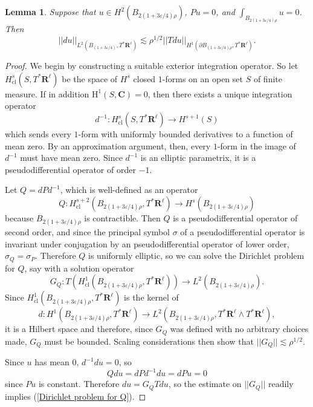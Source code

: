 \documentclass[reqno,12pt,letterpaper]{amsart}
\newcommand{\RR}{\mathbf{R}}
\newcommand{\CC}{\mathbf{C}}
\newcommand{\Homology}{\mathrm H}
\newtheorem{lemma}[theorem]{Lemma}
\theoremstyle{definition}
\numberwithin{equation}{section}
\begin{document}
\begin{lemma}\label{Poincare lemma}
Suppose that $u \in H^2(B_{2(1 + 3\varepsilon/4)\rho})$, $Pu = 0$, and $\int_{B_{2(1 + 3\varepsilon/4)\rho}} u = 0$.
Then
\begin{equation}\label{Dirichlet problem for Q}
||du||_{L^2(B_{(1 + 3\varepsilon/4)}, T^* \RR^\ell)} \lesssim \rho^{1/2} ||Tdu||_{H^1(\partial B_{(1 + 3\varepsilon/4)\rho}, T^* \RR^\ell)}.
\end{equation}
\end{lemma}
\begin{proof}
We begin by constructing a suitable exterior integration operator.
So let $H^s_{\mathrm{cl}}(S, T^* \RR^\ell)$ be the space of $H^s$ closed $1$-forms on an open set $S$ of finite measure.
If in addition $\Homology^1(S, \CC) = 0$, then there exists a unique integration operator
$$d^{-1}: H^s_{\mathrm{cl}}(S, T^* \RR^\ell) \to H^{s + 1}(S)$$
which sends every $1$-form with uniformly bounded derivatives to a function of mean zero.
By an approximation argument, then, every $1$-form in the image of $d^{-1}$ must have mean zero.
Since $d^{-1}$ is an elliptic parametrix, it is a pseudodifferential operator of order $-1$.

Let $Q = dPd^{-1}$, which is well-defined as an operator
$$Q: H^{s + 2}_{\mathrm{cl}}(B_{2(1 + 3\varepsilon/4)\rho}, T^* \RR^\ell) \to H^s(B_{2(1 + 3\varepsilon/4)\rho})$$
because $B_{2(1 + 3\varepsilon/4)\rho}$ is contractible.
Then $Q$ is a pseudodifferential operator of second order, and since the principal symbol $\sigma$ of a pseudodifferential operator is invariant under conjugation by an pseudodifferential operator of lower order, $\sigma_Q = \sigma_P$.
Therefore $Q$ is uniformly elliptic, so we can solve the Dirichlet problem for $Q$, say with a solution operator
$$G_Q: T(H^1_{\mathrm{cl}}(B_{2(1 + 3\varepsilon/4)\rho}, T^* \RR^\ell)) \to L^2(B_{2(1 + 3\varepsilon/4)\rho}).$$
Since $H^1_{\mathrm{cl}}(B_{2(1 + 3\varepsilon/4)\rho}, T^* \RR^\ell)$ is the kernel of
$$d: H^1(B_{2(1 + 3\varepsilon/4)\rho}, T^* \RR^\ell) \to L^2(B_{2(1 + 3\varepsilon/4)\rho}, T^* \RR^\ell \wedge T^* \RR^\ell),$$
it is a Hilbert space and therefore, since $G_Q$ was defined with no arbitrary choices made, $G_Q$ must be bounded.
Scaling considerations then show that $||G_Q|| \lesssim \rho^{1/2}$.

Since $u$ has mean $0$, $d^{-1}du = 0$, so
$$Qdu = dPd^{-1}du = dPu = 0$$
since $Pu$ is constant.
Therefore $du = G_QTdu$, so the estimate on $||G_Q||$ readily implies (\ref{Dirichlet problem for Q}).
\end{proof}
\end{document}
